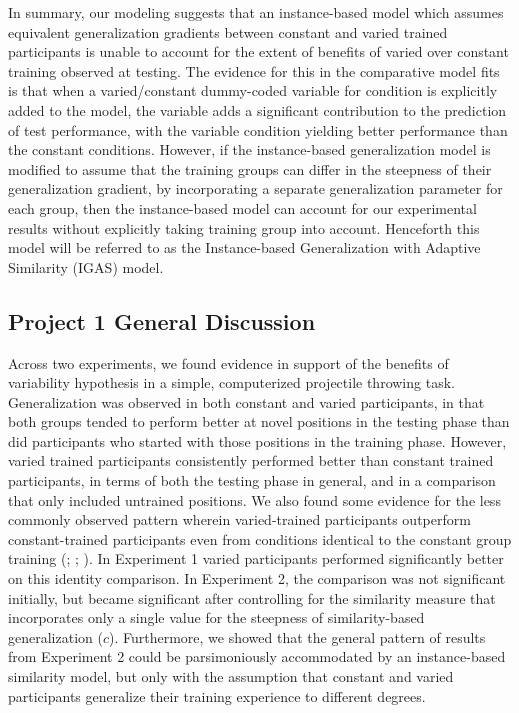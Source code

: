 \documentclass[
  11pt,
  letterpaper,
]{article}
\begin{document}
In summary, our modeling suggests that an instance-based model which
assumes equivalent generalization gradients between constant and varied
trained participants is unable to account for the extent of benefits of
varied over constant training observed at testing. The evidence for this
in the comparative model fits is that when a varied/constant dummy-coded
variable for condition is explicitly added to the model, the variable
adds a significant contribution to the prediction of test performance,
with the variable condition yielding better performance than the
constant conditions. However, if the instance-based generalization model
is modified to assume that the training groups can differ in the
steepness of their generalization gradient, by incorporating a separate
generalization parameter for each group, then the instance-based model
can account for our experimental results without explicitly taking
training group into account. Henceforth this model will be referred to
as the Instance-based Generalization with Adaptive Similarity (IGAS)
model.

\subsection{Project 1 General
Discussion}\label{project-1-general-discussion}

Across two experiments, we found evidence in support of the benefits of
variability hypothesis in a simple, computerized projectile throwing
task. Generalization was observed in both constant and varied
participants, in that both groups tended to perform better at novel
positions in the testing phase than did participants who started with
those positions in the training phase. However, varied trained
participants consistently performed better than constant trained
participants, in terms of both the testing phase in general, and in a
comparison that only included untrained positions. We also found some
evidence for the less commonly observed pattern wherein varied-trained
participants outperform constant-trained participants even from
conditions identical to the constant group training
(; ; ). In Experiment 1 varied participants performed significantly
better on this identity comparison. In Experiment 2, the comparison was
not significant initially, but became significant after controlling for
the similarity measure that incorporates only a single value for the
steepness of similarity-based generalization (\(c\)). Furthermore, we
showed that the general pattern of results from Experiment 2 could be
parsimoniously accommodated by an instance-based similarity model, but
only with the assumption that constant and varied participants
generalize their training experience to different degrees.
\end{document}
